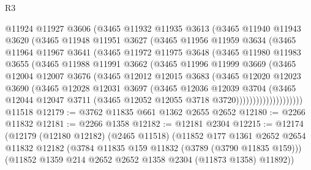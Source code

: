 \begin{lexlean}{R3}
\begin{coremodule}
            @11924
            @11927
            @3606
            (@3465
              @11932
              @11935
              @3613
              (@3465
                @11940
                @11943
                @3620
                (@3465
                  @11948
                  @11951
                  @3627
                  (@3465
                    @11956
                    @11959
                    @3634
                    (@3465
                      @11964
                      @11967
                      @3641
                      (@3465
                        @11972
                        @11975
                        @3648
                        (@3465
                          @11980
                          @11983
                          @3655
                          (@3465
                            @11988
                            @11991
                            @3662
                            (@3465
                              @11996
                              @11999
                              @3669
                              (@3465
                                @12004
                                @12007
                                @3676
                                (@3465
                                  @12012
                                  @12015
                                  @3683
                                  (@3465
                                    @12020
                                    @12023
                                    @3690
                                    (@3465
                                      @12028
                                      @12031
                                      @3697
                                      (@3465
                                        @12036
                                        @12039
                                        @3704
                                        (@3465
                                          @12044
                                          @12047
                                          @3711
                                          (@3465 @12052 @12055 @3718 @3720))))))))))))))))))))
    @11518
@12179 := @3762 @11835 @661 @1362 @2655 @2652
@12180 := @2266 @11832
@12181 := @2266 @1358
@12182 := @12181 @2304
@12215 := @12174
    (@12179
      (@12180 @12182)
      (@2465 @11518)
      (@11852
        @177
        @1361
        @2652
        @2654
        @11832
        @12182
        (@3784 @11835 @159 @11832 (@3789 (@3790 @11835 @159)))
        (@11852 @1359 @214 @2652 @2652 @1358 @2304 (@11873 @1358) @11892))

\end{coremodule}
\end{lexlean}
